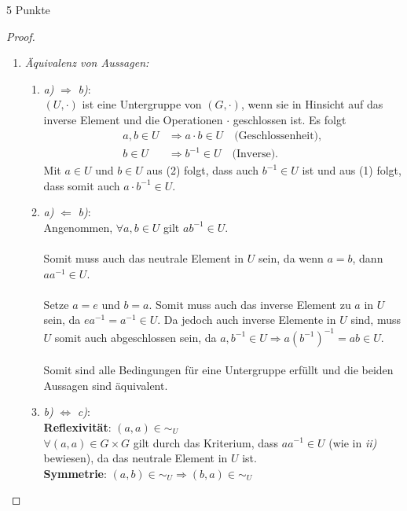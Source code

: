 \documentclass{../problemset}
\begin{document}
\begin{problem}{5 Punkte}
\begin{proof}
	\begin{enumerate}
		\item \textit{Äquivalenz von Aussagen:}
		      \begin{enumerate}[label=\alph*)]
			      \item \textit{a)} $\Longrightarrow$ \textit{b)}: \\
			            $(U, \cdot)$ ist eine Untergruppe von $(G, \cdot)$, wenn sie in Hinsicht auf das inverse Element und die Operationen $\cdot$ geschlossen ist.
			            Es folgt
			            \begin{align}
				            a, b \in U & \Longrightarrow a \cdot b \in U \quad \text{(Geschlossenheit)}, \\
				            b \in U    & \Longrightarrow b^{-1} \in U \quad \text{(Inverse)}.
			            \end{align}
			            Mit $a \in U$ und $b \in U$ aus (2) folgt, dass auch $b^{-1} \in U$ ist und aus (1) folgt, dass somit auch $a \cdot b^{-1} \in U$. \checkmark
			      \item \textit{a)} $\Longleftarrow$ \textit{b)}: \\
			            Angenommen, $\forall a,b \in U$ gilt $ab^{-1} \in U$. \\
			            \\
			            Somit muss auch das neutrale Element in $U$ sein, da wenn $a=b$, dann $aa^{-1} \in U$. \\
			            \\
			            Setze $a=e$ und $b=a$. Somit muss auch das inverse Element zu $a$ in $U$ sein, da $ea^{-1} = a^{-1} \in U$.
			            Da jedoch auch inverse Elemente in $U$ sind, muss $U$ somit auch abgeschlossen sein, da $a,b^{-1} \in U \Longrightarrow a{(b^{-1})}^{-1} = ab \in U$. \\
			            \\
			            Somit sind alle Bedingungen für eine Untergruppe erfüllt und die beiden Aussagen sind äquivalent. \checkmark
			      \item \textit{b)} $\Longleftrightarrow$ \textit{c)}: \\
			            \textbf{Reflexivität}: $(a, a) \in \sim_U$ \\
			            $\forall (a,a) \in G \times G$ gilt durch das Kriterium, dass $aa^{-1} \in U$ (wie in \textit{ii)} bewiesen), da das neutrale Element in $U$ ist. \checkmark \\
			            \textbf{Symmetrie}: $(a, b) \in \sim_U \Longrightarrow (b,a) \in \sim_U$ \\

\end{enumerate}
\end{enumerate}
\end{proof}
\end{problem}
\end{document}
